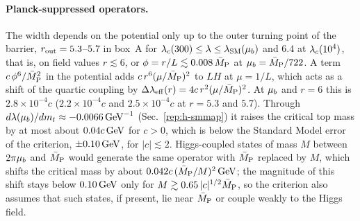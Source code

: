 \paragraph{Planck-suppressed operators.}
The width depends on the potential only up to the outer turning point of the barrier, $r_{\rm out}=5.3$--$5.7$ in box~A for $\lambda_c(300)\le\lambda\le\lambda_{\rm SM}(\mu_b)$ and $6.4$ at $\lambda_c(10^4)$, that is, on field values $r\lesssim6$, or $\phi=r/L\lesssim0.008\,\bar M_{\mathrm{P}}$ at $\mu_b=\bar M_{\mathrm{P}}/722$. %
A term $c\,\phi^6/\bar M_{\mathrm{P}}^2$ in the potential adds $c\,r^6(\mu/\bar M_{\mathrm{P}})^2$ to $LH$ at $\mu=1/L$, which acts as a shift of the quartic coupling by $\Delta\lambda_{\rm eff}(r)=4c\,r^2(\mu/\bar M_{\mathrm{P}})^2$.
At $\mu_b$ and $r=6$ this is $2.8\times10^{-4}c$ ($2.2\times10^{-4}c$ and $2.5\times10^{-4}c$ at $r=5.3$ and $5.7$). %
Through $d\lambda(\mu_b)/dm_t\approx-0.0066\,\mathrm{GeV}^{-1}$ (Sec.~\ref{rep:h-smmap}) it raises the critical top mass by at most about $0.04c\,\mathrm{GeV}$ for $c>0$, which is below the Standard Model error of the criterion, $\pm0.10\,\mathrm{GeV}$, for $|c|\lesssim2$. %
Higgs-coupled states of mass $M$ between $2\pi\mu_b$ and $\bar M_{\mathrm{P}}$ would generate the same operator with $\bar M_{\mathrm{P}}$ replaced by $M$, which shifts the critical mass by about $0.042c\,(\bar M_{\mathrm{P}}/M)^2\,\mathrm{GeV}$; the magnitude of this shift stays below $0.10\,\mathrm{GeV}$ only for $M\gtrsim0.65\,|c|^{1/2}\bar M_{\mathrm{P}}$, so the criterion also assumes that such states, if present, lie near $\bar M_{\mathrm{P}}$ or couple weakly to the Higgs field. %
